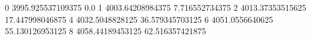 0 3995.925537109375 0.0
1 4003.64208984375 7.716552734375
2 4013.37353515625 17.447998046875
4 4032.5048828125 36.579345703125
6 4051.0556640625 55.130126953125
8 4058.44189453125 62.516357421875
